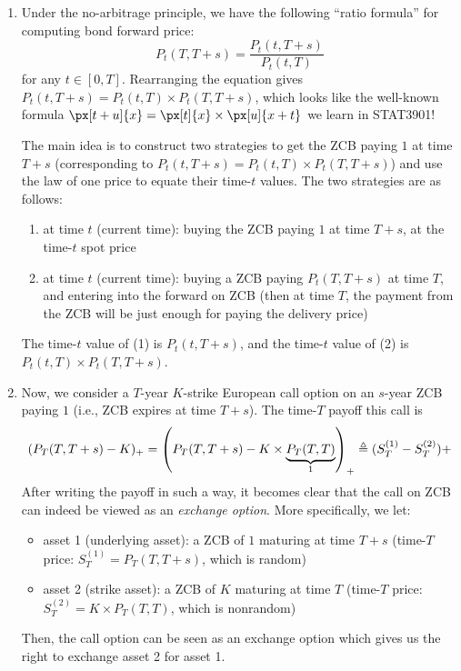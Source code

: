 \begin{enumerate}
\item \label{it:bond-fwd-price-ratio-fmla} Under the no-arbitrage principle, we
have the following ``ratio formula'' for computing bond forward price:
\[
\boxed{P_t(T,T+s)=\frac{P_t(t,T+s)}{P_t(t,T)}}
\]
for any \(t\in[0,T]\). Rearranging the equation gives
\(P_t(t,T+s)=P_t(t,T)\times P_t(T,T+s)\), which looks like the well-known
formula \(\px[t+u]{x}=\px[t]{x}\times \px[u]{x+t}\) we learn in STAT3901!

\begin{pf}
The main idea is to construct two strategies to get the ZCB paying \(1\) at time
\(T+s\) (corresponding to \(P_t(t,T+s)=P_t(t,T)\times P_t(T,T+s)\)) and use the
law of one price to equate their time-\(t\) values. The two strategies are as
follows:
\begin{enumerate}[label={(\arabic*)}]
\item at time \(t\) (current time): buying the ZCB paying \(1\) at time \(T+s\), at the time-\(t\) spot price
\item at time \(t\) (current time): buying a ZCB paying \(P_t(T,T+s)\) at time
\(T\), and entering into the forward on ZCB (then at time \(T\), the payment
from the ZCB will be just enough for paying the delivery price)
\end{enumerate}
The time-\(t\) value of (1) is \(P_t(t,T+s)\), and the time-\(t\) value of (2)
is \(P_t(t,T)\times P_t(T,T+s)\).
\end{pf}

\item Now, we consider a \(T\)-year \(K\)-strike European call option on an
\(s\)-year ZCB paying \(1\) (i.e., ZCB expires at time \(T+s\)). The time-\(T\)
payoff this call is
\[
(P_T(T,T+s)-K)_{+}
=\qty(P_T(T,T+s)-K\times \underbrace{P_T(T,T)}_{1})_{+}
\triangleq (S_T^{(1)}-S_T^{(2)})+
\]
After writing the payoff in such a way, it becomes clear that the call on ZCB can
indeed be viewed as an \emph{exchange option}. More specifically, we let:
\begin{itemize}
\item asset 1 (underlying asset): a ZCB of \(1\) maturing at time \(T+s\)
(time-\(T\) price: \(S_T^{(1)}=P_T(T,T+s)\), which is random)
\item asset 2 (strike asset): a ZCB of \(K\) maturing at time \(T\) (time-\(T\)
price: \(S_T^{(2)}=K\times P_T(T,T)\), which is nonrandom)
\end{itemize}
Then, the call option can be seen as an exchange option which gives us the
right to exchange asset 2 for asset 1.


\end{enumerate}
